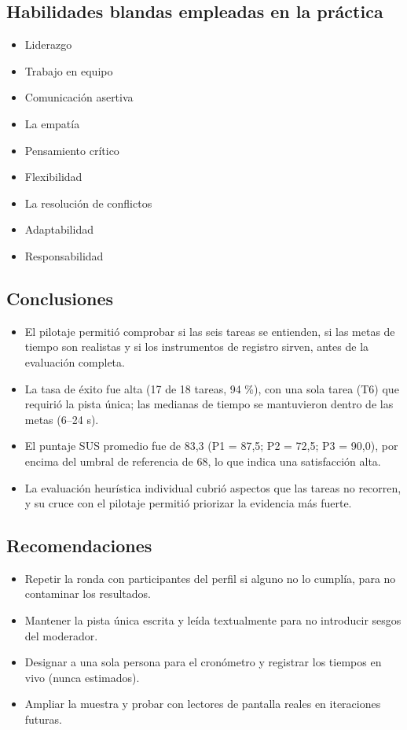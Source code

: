 \documentclass{article}
\begin{document}
\subsection{Habilidades blandas empleadas en la práctica}
\begin{itemize}[leftmargin=1.5em, itemsep=2pt]
    \item[$\blacksquare$] Liderazgo
    \item[$\blacksquare$] Trabajo en equipo
    \item[$\blacksquare$] Comunicación asertiva
    \item[$\square$] La empatía
    \item[$\blacksquare$] Pensamiento crítico
    \item[$\square$] Flexibilidad
    \item[$\square$] La resolución de conflictos
    \item[$\square$] Adaptabilidad
    \item[$\blacksquare$] Responsabilidad
\end{itemize}

\subsection{Conclusiones}
\begin{itemize}[leftmargin=1.5em, itemsep=2pt]
    \item El pilotaje permitió comprobar si las seis tareas se entienden, si las metas de tiempo son realistas y si los instrumentos de registro sirven, antes de la evaluación completa.
    \item La tasa de éxito fue alta (17 de 18 tareas, 94 \%), con una sola tarea (T6) que requirió la pista única; las medianas de tiempo se mantuvieron dentro de las metas (6–24 s).
    \item El puntaje SUS promedio fue de 83,3 (P1 = 87,5; P2 = 72,5; P3 = 90,0), por encima del umbral de referencia de 68, lo que indica una satisfacción alta.
    \item La evaluación heurística individual cubrió aspectos que las tareas no recorren, y su cruce con el pilotaje permitió priorizar la evidencia más fuerte.
\end{itemize}

\subsection{Recomendaciones}
\begin{itemize}[leftmargin=1.5em, itemsep=2pt]
    \item Repetir la ronda con participantes del perfil si alguno no lo cumplía, para no contaminar los resultados.
    \item Mantener la pista única escrita y leída textualmente para no introducir sesgos del moderador.
    \item Designar a una sola persona para el cronómetro y registrar los tiempos en vivo (nunca estimados).
    \item Ampliar la muestra y probar con lectores de pantalla reales en iteraciones futuras.
\end{itemize}
\end{document}
